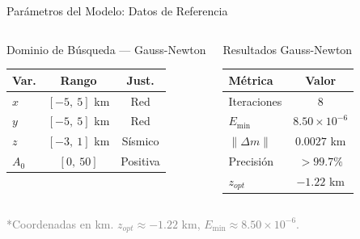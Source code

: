 \begin{frame}{Parámetros del Modelo: Datos de Referencia}
\begin{columns}[T]

        \vspace{-0.3cm}

        \begin{block}{Dominio de Búsqueda — Gauss-Newton}
            \centering
            \scriptsize
            \begin{tabular}{@{}lcc@{}}
                \toprule
                \textbf{Var.} & \textbf{Rango} & \textbf{Just.} \\ \midrule
                $x$ & $[-5,\ 5]$ km & Red \\[0.1cm]
                $y$ & $[-5,\ 5]$ km & Red \\[0.1cm]
                $z$ & $[-3,\ 1]$ km & Sísmico \\[0.1cm]
                $A_0$ & $[0,\ 50]$ & Positiva \\
                \bottomrule
            \end{tabular}
        \end{block}

        \vspace{0.08cm}

        \begin{block}{Resultados Gauss-Newton}
            \centering
            \scriptsize
            \begin{tabular}{@{}lc@{}}
                \toprule
                \textbf{Métrica} & \textbf{Valor} \\ \midrule
                Iteraciones & $8$ \\[0.08cm]
                $E_{\min}$ & $8.50 \times 10^{-6}$ \\[0.08cm]
                $\|\Delta m\|$ & $0.0027$ km \\[0.08cm]
                Precisión & $> 99.7\%$ \\[0.08cm]
                $z_{opt}$ & $-1.22$ km \\
                \bottomrule
            \end{tabular}
        \end{block}

    \end{columns}

    \vspace{0.05cm}
    \begin{center}
        \tiny \textcolor{gray}{*Coordenadas en km. $z_{opt} \approx -1.22$ km, $E_{\min} \approx 8.50 \times 10^{-6}$.}
    \end{center}

\end{frame}